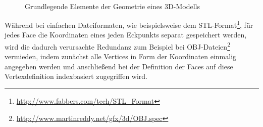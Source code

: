 \begin{figure}
\centering
{}
\qquad
{}
\qquad
{}\\
\caption{Grundlegende Elemente der Geometrie eines 3D-Modells}
\label{schlenke:fig:fundamentals:geo}
\end{figure}

Während bei einfachen Dateiformaten, wie beispielsweise dem STL-Format\footnote{\url{http://www.fabbers.com/tech/STL_Format}}, für jedes Face die Koordinaten eines jeden Eckpunkts separat gespeichert werden, wird die dadurch verursachte Redundanz zum Beispiel bei OBJ-Dateien\footnote{\url{http://www.martinreddy.net/gfx/3d/OBJ.spec}} vermieden, indem zunächst alle Vertices in Form der Koordinaten einmalig angegeben werden und anschließend bei der Definition der Faces auf diese Vertexdefinition indexbasiert zugegriffen wird.

